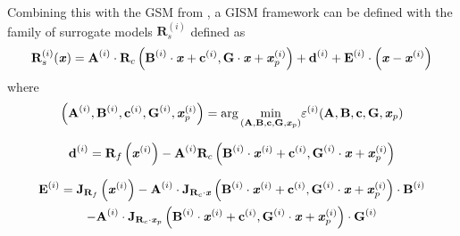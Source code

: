 Combining this with the GSM from \cite{SMOptAlgEngDesignKoziel}, a GISM framework can be defined with the family of surrogate models $\textbf{R}^{(i)}_s$ defined as
\begin{equation}
\textbf{R}^{(i)}_s(\textbf{\textit{x}}) 
= \textbf{A}^{(i)} \cdot \textbf{R}_c
\left( \textbf{B}^{(i)}\cdot\textbf{\textit{x}} + \textbf{c}^{(i)} , \textbf{G}\cdot\textbf{\textit{x}} + \textbf{\textit{x}}^{(i)}_p \right) + 
\textbf{d}^{(i)} + \textbf{E}^{(i)} \cdot \left( \textbf{\textit{x}} - \textbf{\textit{x}}^{(i)} \right)
\end{equation}
where 
\begin{equation}
\left( \textbf{A}^{(i)}, \textbf{B}^{(i)}, \textbf{c}^{(i)}, \textbf{G}^{(i)}, \textbf{\textit{x}}^{(i)}_p \right) = 
\textup{arg} \, \underset{(\textbf{A},\textbf{B},\textbf{c},\textbf{G},\textbf{\textit{x}}_p)}{\textup{min}} 
\varepsilon^{(i)}(\textbf{A},\textbf{B},\textbf{c},\textbf{G},\textbf{\textit{x}}_p)
\end{equation}

\begin{equation}
\textbf{d}^{(i)} = \textbf{R}_f \left( \textbf{\textit{x}}^{(i)} \right) - 
\textbf{A}^{(i)} \textbf{R}_c
\left(
     \textbf{B}^{(i)} \cdot  \textbf{\textit{x}}^{(i)} + \textbf{c}^{(i)},
     \textbf{G}^{(i)} \cdot \textbf{\textit{x}} + \textbf{\textit{x}}^{(i)}_p
\right)
\label{eqn:d}
\end{equation}

\begin{multline}
\textbf{E}^{(i)} = \textbf{J}_{\textbf{R}_f} \left( \textbf{\textit{x}}^{(i)} \right) 
- 
\textbf{A}^{(i)} \cdot \textbf{J}_{\textbf{R}_c \cdot \textbf{\textit{x}}}
    \left(
        \textbf{B}^{(i)} \cdot \textbf{\textit{x}}^{(i)} + \textbf{c}^{(i)},
        \textbf{G}^{(i)} \cdot \textbf{\textit{x}} + \textbf{\textit{x}}^{(i)}_p
    \right) \cdot \textbf{B}^{(i)} 
\\ -
\textbf{A}^{(i)} \cdot \textbf{J}_{\textbf{R}_c \cdot \textbf{\textit{x}}_p}
    \left(
        \textbf{B}^{(i)} \cdot \textbf{\textit{x}}^{(i)} + \textbf{c}^{(i)},
        \textbf{G}^{(i)} \cdot \textbf{\textit{x}} + \textbf{\textit{x}}^{(i)}_p
    \right) \cdot \textbf{G}^{(i)}
\label{eqn:E}
\end{multline}

